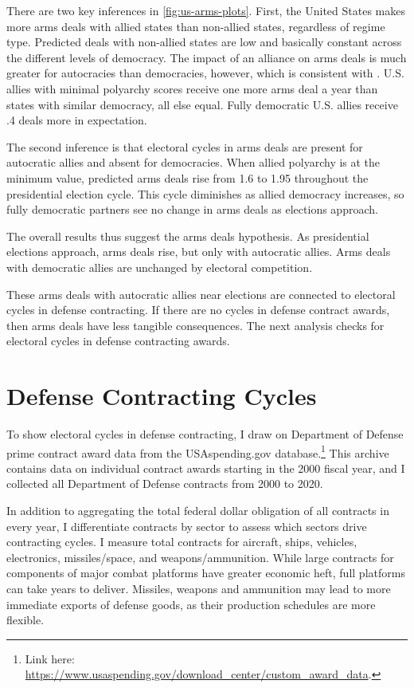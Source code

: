 \documentclass[12pt]{article}
\begin{document}
There are two key inferences in \autoref{fig:us-arms-plots}.
First, the United States makes more arms deals with allied states than non-allied states, regardless of regime type. 
Predicted deals with non-allied states are low and basically constant across the different levels of democracy. 
The impact of an alliance on arms deals is much greater for autocracies than democracies, however, which is consistent with \citep{McManusYarhi-Milo2017}. 
U.S. allies with minimal polyarchy scores receive one more arms deal a year than states with similar democracy, all else equal. 
Fully democratic U.S. allies receive .4 deals more in expectation. 


The second inference is that electoral cycles in arms deals are present for autocratic allies and absent for democracies.
When allied polyarchy is at the minimum value, predicted arms deals rise from 1.6 to 1.95 throughout the presidential election cycle. 
This cycle diminishes as allied democracy increases, so fully democratic partners see no change in arms deals as elections approach.  


The overall results thus suggest the arms deals hypothesis. 
As presidential elections approach, arms deals rise, but only with autocratic allies. 
Arms deals with democratic allies are unchanged by electoral competition.


These arms deals with autocratic allies near elections are connected to electoral cycles in defense contracting. 
If there are no cycles in defense contract awards, then arms deals have less tangible consequences. 
The next analysis checks for electoral cycles in defense contracting awards. 



\section{Defense Contracting Cycles}


To show electoral cycles in defense contracting, I draw on Department of Defense prime contract award data from the USAspending.gov database.\footnote{Link here: \url{https://www.usaspending.gov/download_center/custom_award_data}.} 
This archive contains data on individual contract awards starting in the 2000 fiscal year, and I collected all Department of Defense contracts from 2000 to 2020.


In addition to aggregating the total federal dollar obligation of all contracts in every year, I differentiate contracts by sector to assess which sectors drive contracting cycles. 
I measure total contracts for aircraft, ships, vehicles, electronics, missiles/space, and weapons/ammunition. 
While large contracts for components of major combat platforms have greater economic heft, full platforms can take years to deliver. 
Missiles, weapons and ammunition may lead to more immediate exports of defense goods, as their production schedules are more flexible.
\end{document}
